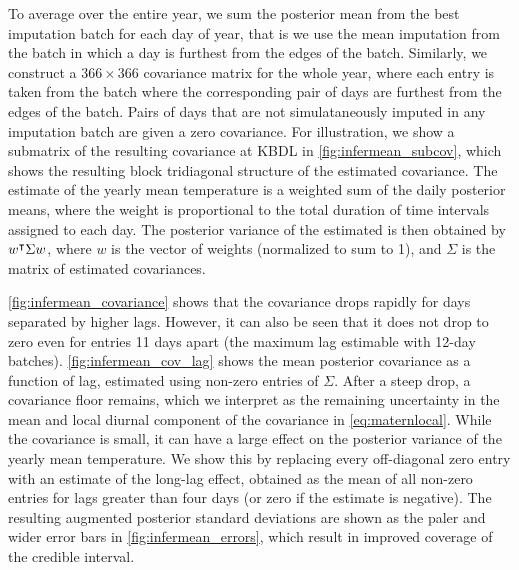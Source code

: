 To average over the entire year, we sum the posterior mean from the best imputation batch
for each day of year, that is we use the mean imputation from the batch
in which a day is furthest from the edges of the batch.
Similarly, we construct a $366 \times 366$ covariance matrix for the whole year,
where each entry is taken from the batch where the corresponding pair of days
are furthest from the edges of the batch.
Pairs of days that are not simulataneously imputed in any imputation batch are
given a zero covariance.
For illustration, we show a submatrix of the resulting covariance at KBDL in
\autoref{fig:infermean_subcov}, which shows the resulting block tridiagonal
structure of the estimated covariance.
The estimate of the yearly mean temperature is a weighted sum of the daily posterior means,
where the weight is proportional to the total duration of time intervals assigned to each day.
The posterior variance of the estimated is then obtained by $w^{\intercal} \Sigma w$,
where $w$ is the vector of weights (normalized to sum to 1), and $\Sigma$ is the matrix of
estimated covariances.

\autoref{fig:infermean_covariance} shows that the covariance drops rapidly
for days separated by higher lags.
However, it can also be seen that it does not drop to zero even for entries 11 days apart
(the maximum lag estimable with 12-day batches).
\autoref{fig:infermean_cov_lag} shows the mean posterior covariance as a function of lag,
estimated using non-zero entries of $\Sigma$.
After a steep drop, a covariance floor remains, which we interpret
as the remaining uncertainty in the mean and local diurnal component of the
covariance in \autoref{eq:maternlocal}.
While the covariance is small, it can have a large effect on the posterior variance
of the yearly mean temperature.
We show this by replacing every off-diagonal zero entry with an estimate of the
long-lag effect, obtained as the mean of all non-zero entries for lags greater than four days
(or zero if the estimate is negative).
The resulting augmented posterior standard deviations are shown as the paler and wider error bars
in \autoref{fig:infermean_errors}, which result in improved coverage of the credible interval.

